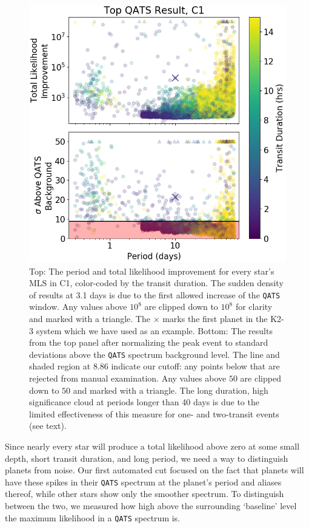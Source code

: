 \documentclass[twocolumn]{aastex62}
\newcommand{\pipeline}[1]{\texttt{#1}}
\begin{document}
\begin{figure}[tbp]
\includegraphics[width=\columnwidth]{likelihoods.png}
\caption{Top: The period and total likelihood improvement for every
  star's MLS in C1, color-coded by the transit duration. The sudden
  density of results at 3.1 days is due to the first allowed increase
  of the \pipeline{QATS} window. Any values above $10^8$ are clipped
  down to $10^8$ for clarity and marked with a triangle. The $\times$
  marks the first planet in the K2-3 system which we have used as an
  example.  Bottom: The results from the top panel after normalizing
  the peak event to standard deviations above the \pipeline{QATS}
  spectrum background level. The line and shaded region at 8.86
  indicate our cutoff: any points below that are rejected from manual
  examination.  Any values above $50$ are clipped down to $50$ and
  marked with a triangle. The long duration, high significance cloud
  at periods longer than 40 days is due to the limited effectiveness
  of this measure for one- and two-transit events (see
  text). \label{likelihoods}}
\end{figure}

Since nearly every star will produce a total likelihood above zero at
some small depth, short transit duration, and long period, we need a
way to distinguish planets from noise.  Our first automated cut
focused on the fact that planets will have these spikes in their
\pipeline{QATS} spectrum at the planet's period and aliases thereof,
while other stars show only the smoother spectrum. To distinguish
between the two, we measured how high above the surrounding `baseline'
level the maximum likelihood in a \pipeline{QATS} spectrum is.
\end{document}
